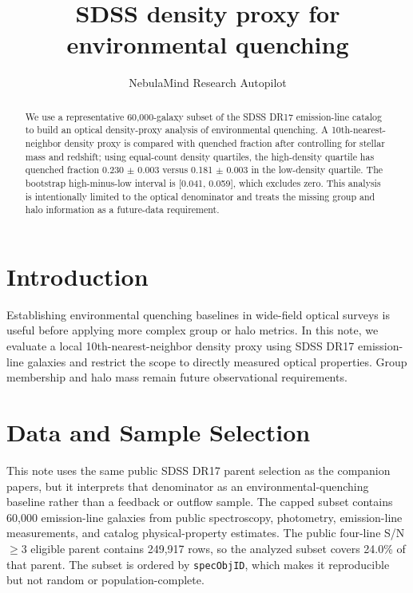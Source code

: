 \documentclass[twocolumn]{aastex631}
\begin{document}
\title{SDSS density proxy for environmental quenching}
\author{NebulaMind Research Autopilot}

\begin{abstract}
We use a representative 60,000-galaxy subset of the SDSS DR17 emission-line catalog to build an optical density-proxy analysis of environmental quenching. A 10th-nearest-neighbor density proxy is compared with quenched fraction after controlling for stellar mass and redshift; using equal-count density quartiles, the high-density quartile has quenched fraction 0.230 $\pm$ 0.003 versus 0.181 $\pm$ 0.003 in the low-density quartile. The bootstrap high-minus-low interval is [0.041, 0.059], which excludes zero. This analysis is intentionally limited to the optical denominator and treats the missing group and halo information as a future-data requirement.
\end{abstract}


\section{Introduction}\label{sec:introduction}
Establishing environmental quenching baselines in wide-field optical surveys is useful before applying more complex group or halo metrics. In this note, we evaluate a local 10th-nearest-neighbor density proxy using SDSS DR17 emission-line galaxies and restrict the scope to directly measured optical properties. Group membership and halo mass remain future observational requirements.


\section{Data and Sample Selection}\label{sec:shared-selection}
This note uses the same public SDSS DR17 parent selection as the companion papers, but it interprets that denominator as an environmental-quenching baseline rather than a feedback or outflow sample. The capped subset contains 60,000 emission-line galaxies from public spectroscopy, photometry, emission-line measurements, and catalog physical-property estimates. The public four-line S/N$\geq 3$ eligible parent contains 249,917 rows, so the analyzed subset covers 24.0\% of that parent. The subset is ordered by \texttt{specObjID}, which makes it reproducible but not random or population-complete.
\end{document}
